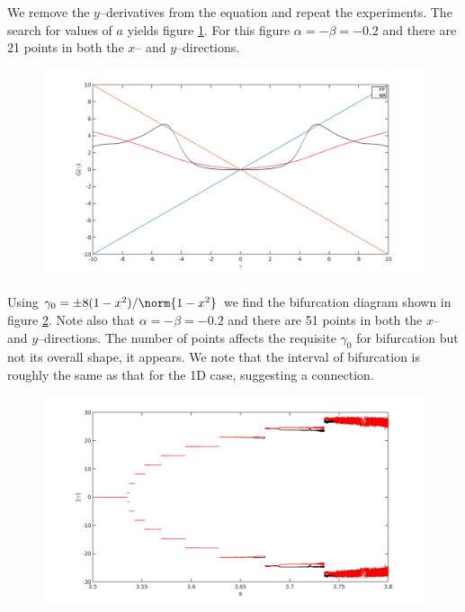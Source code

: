 \documentclass{article}
\begin{document}
We remove the $y$--derivatives from the equation and repeat the experiments.
The search for values of $a$ yields figure \ref{fig:2Dsearch}.
For this figure $\alpha = -\beta = -0.2$ and there are 21 points in both the $x$-- and $y$--directions.

\begin{figure}
\includegraphics[width=\textwidth]{exp16_02.png}
\caption{}
\label{fig:2Dsearch}
\end{figure}

Using $\gamma_0 = \pm 8 (1-x^2) / \norm{1 - x^2}$ we find the bifurcation diagram shown in figure \ref{fig:2Dbifurc}.
Note also that $\alpha = -\beta = -0.2$ and there are 51 points in both the $x$-- and $y$--directions.
The number of points affects the requisite $\gamma_0$ for bifurcation but not its overall shape, it appears.
We note that the interval of bifurcation is roughly the same as that for the 1D case, suggesting a connection.

\begin{figure}
\includegraphics[width=\textwidth]{exp15_02.png}
\caption{}
\label{fig:2Dbifurc}
\end{figure}
\end{document}
